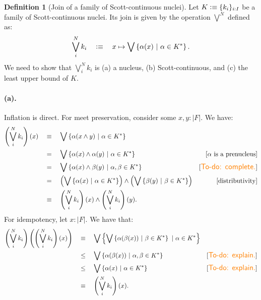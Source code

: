 \documentclass[a4paper, 11pt]{article}
\theoremstyle{definition}
\newtheorem{defn}{Definition}
\newcommand{\paren}[1]{\left( #1 \right)}
\newcommand{\setof}[1]{\left\{ #1 \right\}}
\newcommand{\is}{\vcentcolon\equiv}
\newcommand{\todo}[1]{{\large\color{orange}\textsf{To-do: #1.}}}
\begin{document}
\begin{defn}[Join of a family of Scott-continuous nuclei]
  Let $K \is \{ k_i \}_{i : I}$ be a family of Scott-continuous nuclei. Its join is given by
  the operation $\bigvee^N$ defined as:
  \begin{equation*}
    \bigvee^N_{i} k_i \quad\is\quad x \mapsto \bigvee \left\{ \alpha(x) ~|~ \alpha \in K^* \right\}.
  \end{equation*}
  We need to show that $\bigvee^N_{i} k_i$ is
    (a) a nucleus,
    (b) Scott-continuous, and
    (c) the least upper bound of $K$.

  \paragraph{(a).} Inflation is direct. For meet preservation, consider some $x, y : | F |$. We have:
  \begin{align*}
    \left(\bigvee^N_{i} k_i\right)(x)
    &\quad\equiv\quad \bigvee \left\{ \alpha(x \wedge y) ~|~ \alpha \in K^* \right\} \\
    &\quad=\quad \bigvee \left\{ \alpha(x) \wedge \alpha(y) ~|~ \alpha \in K^* \right\}
          & [\text{$\alpha$ is a prenucleus}] \\
    &\quad=\quad \bigvee \left\{ \alpha(x) \wedge \beta(y) ~|~ \alpha, \beta \in K^* \right\}
          & [\text{\todo{complete}}] \\
    &\quad=\quad \paren{\bigvee \setof{ \alpha(x) ~|~ \alpha \in K^* }} \wedge \paren{\bigvee \setof{ \beta(y) ~|~ \beta \in K^* }}
          & [\text{distributivity}] \\
    &\quad\equiv\quad \paren{\bigvee^N_i k_i}(x) \wedge \paren{\bigvee^N_i k_i}(y).
  \end{align*}
  For idempotency, let $x : | F |$. We have that:
  \begin{align*}
    \left(\bigvee^N_{i} k_i\right)\left(\left(\bigvee^N_{i} k_i\right)(x)\right)
    &\quad\equiv\quad \bigvee \setof{ \bigvee \setof{ \alpha(\beta(x)) ~|~ \beta \in K^* } ~|~ \alpha \in K^* } \\
    &\quad\le\quad \bigvee \setof{ \alpha(\beta(x)) ~|~ \alpha, \beta \in K^* } & [\text{\todo{explain}}]\\
    &\quad\le\quad \bigvee \setof{ \alpha(x) ~|~ \alpha \in K^* } & [\text{\todo{explain}}]\\
    &\quad\equiv\quad \paren{\bigvee^N_i k_i}(x).
  \end{align*}


\end{defn}
\end{document}
